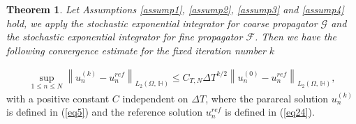 \documentclass[preprint,12pt]{elsarticle}
\newtheorem{theorem}{Theorem}%
\begin{document}
\begin{theorem}\label{theorem2}
	Let  Assumptions \ref{assump1}, \ref{assump2}, \ref{assump3} and \ref{assump4} hold,  we apply the stochastic exponential integrator for coarse propagator $\mathcal{G}$ and the stochastic exponential integrator for fine propagator $\mathcal{F}$. Then we have the following convergence estimate for the fixed iteration number $k$ 
\end{theorem}
\begin{align}\label{eq26}
	\sup\limits_{1\leq n \leq N}\left\|u_{n}^{(k)}-u_{n}^{ref}\right\|_{L_{2}(\Omega,\,\mathbb{H})}\leq  C_{T,N}\Delta T^{k/2} \left\|u_{n}^{(0)}-u_{n}^{ref}\right\|_{L_{2}(\Omega,\,\mathbb{H})},
\end{align}
with a positive constant $C$ independent on $\Delta T$, where the parareal solution $u_{n}^{(k)}$ is defined in (\ref{eq5}) and the reference solution $u_{n}^{ref}$ is defined in (\ref{eq24}).
\end{document}
